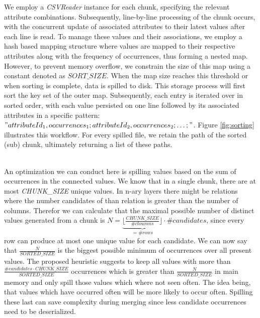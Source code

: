 We employ a \textit{CSVReader} instance for each chunk, specifying the relevant attribute combinations. Subsequently, line-by-line processing of the chunk occurs, with the concurrent update of associated attributes to their latest values after each line is read. To manage these values and their associations, we employ a hash based mapping structure where values are mapped to their respective attributes along with the frequency of occurrences, thus forming a nested map. However, to prevent memory overflow, we constrain the size of this map using a constant denoted as $SORT\_SIZE$. When the map size reaches this threshold or when sorting is complete, data is spilled to disk. This storage process will first sort the key set of the outer map. Subsequently, each entry is iterated over in sorted order, with each value persisted on one line followed by its associated attributes in a specific pattern: $"attributeId_1,occurrences_1;attributeId_2,occurrences_2;\dots;"$. Figure \ref{fig:sorting} illustrates this workflow. For every spilled file, we retain the path of the sorted (sub) chunk, ultimately returning a list of these paths.

\noindent \\An optimization we can conduct here is spilling values based on the sum of occurrences in the connected values. We know that in a single chunk, there are at most \textit{CHUNK\_SIZE} unique values. In n-ary layers there might be relations where the number candidates of than relation is greater than the number of columns. Therefor we can calculate that the maximal possible number of distinct values generated from a chunk is $N = \underbrace{\lfloor \frac{CHUNK\_SIZE}{\#cloumns} \rfloor}_{= \#rows} \cdot \#candidates$, since every row can produce at most one unique value for each candidate. We can now say that $\frac{N}{SORTED\_SIZE}$ is the biggest possible minimum of occurrences over all present values. The proposed heuristic suggests to keep all values with more than $\frac{\#candidates \cdot CHUNK\_SIZE}{SORTED\_SIZE}$ occurrences which is greater than $\frac{N}{SORTED\_SIZE}$ in main memory and only spill those values which where not seen often. The idea being, that values which have occurred often will be more likely to occur often. Spilling these last can save complexity during merging since less candidate occurrences need to be deserialized.

